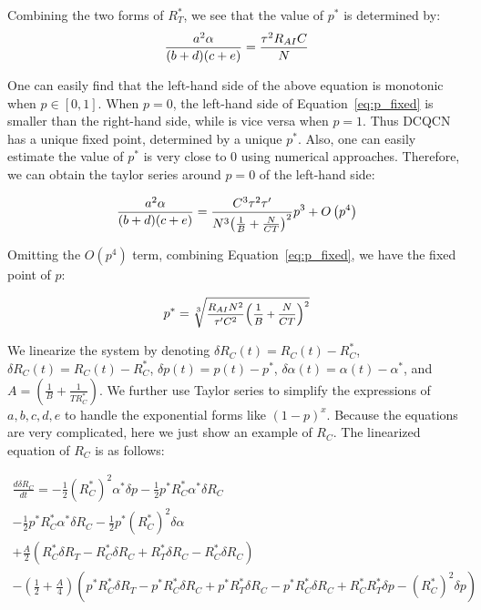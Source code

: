 Combining the two forms of $R_T^*$, we see that the value of $p^*$ is determined by:
\begin{equation}
\small
\frac{{{a^2}\alpha }}{{(b + d)(c + e)}} = \frac{{{\tau ^2}{R_{AI}}C}}{N}
\label{eq:p_fixed}
\end{equation}

One can easily find that the left-hand side of the above equation is monotonic when $p \in [0,1]$.
When $p = 0$, the left-hand side of Equation~\ref{eq:p_fixed} is smaller than the right-hand side,
while is vice versa when $p = 1$. Thus DCQCN has a unique fixed point, determined by a unique $p^*$. 
Also, one can easily estimate the value of $p^*$ is very 
close to 0 using numerical approaches. Therefore, we can obtain the taylor series around $p=0$ of the left-hand side:

\begin{equation}
\small
\frac{{{a^2}\alpha }}{{(b + d)(c + e)}} = \frac{{{C^3}{\tau ^2}\tau '}}{{{N^3}{{\left( {\frac{1}{B} + \frac{N}{{CT}}} \right)}^2}}}{p^3} + O\left( {{p^4}} \right)
\end{equation}

Omitting the $O(p^4)$ term, combining Equation~\ref{eq:p_fixed}, we have the fixed point of $p$:

\begin{equation}
\small
{p^*} = \sqrt[3]{{\frac{{{R_{AI}}{N^2}}}{{\tau '{C^2}}}{{\left( {\frac{1}{B} + \frac{N}{{CT}}} \right)}^2}}}
\end{equation}

We linearize the system by denoting $\delta {R_C}(t) = {R_C}(t) - R_C^*$, $\delta {R_C}(t) = {R_C}(t) - R_C^*$,
$\delta p(t) = p(t) - p^*$, $\delta \alpha (t) = \alpha (t) - \alpha^*$, and $A = \left( {\frac{1}{B} + \frac{1}{{TR_C^*}}} \right)$.
We further use Taylor series to simplify the expressions of $a, b, c, d, e$ to handle the exponential forms like $(1-p)^x$.
Because the equations are very complicated, here we just show an example of $R_C$. The linearized equation of $R_C$ is as follows:

\begin{equation}
\begin{array}{l}
\frac{{d\delta {R_C}}}{{dt}} =  - \frac{1}{2}{(R_C^*)^2}{\alpha ^*}\delta p - \frac{1}{2}{p^*}R_C^*{\alpha ^*}\delta R_C \\
 - \frac{1}{2}{p^*}R_C^*{\alpha ^*}\delta {R_C} - \frac{1}{2}{p^*}{(R_C^*)^2}\delta \alpha \\
 + \frac{A}{2}\left( {R_C^*\delta {R_T} - R_C^*\delta {R_C} + R_T^*\delta {R_C} - R_C^*\delta R_C} \right)\\
 - \left( {\frac{1}{2} + \frac{A}{4}} \right)\left( {{p^*}R_C^*\delta {R_T} - {p^*}R_C^*\delta {R_C} + {p^*}R_T^*\delta {R_C} - {p^*}R_C^*\delta R_C + R_C^*R_T^*\delta p - {{(R_C^*)}^2}\delta p} \right)
\end{array}
\end{equation}

